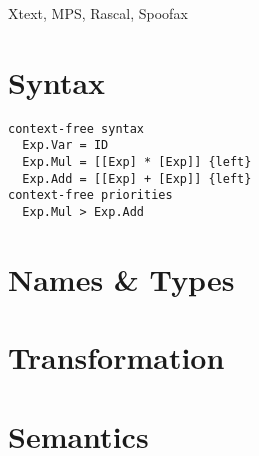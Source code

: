 Xtext, MPS, Rascal, Spoofax

\newpage



\newpage
\chapter{Syntax}

\begin{verbatim}
context-free syntax
  Exp.Var = ID
  Exp.Mul = [[Exp] * [Exp]] {left}
  Exp.Add = [[Exp] + [Exp]] {left}
context-free priorities
  Exp.Mul > Exp.Add
\end{verbatim}


\newpage
\chapter{Names \& Types}

\newpage
\chapter{Transformation}

\newpage
\newpage
\chapter{Semantics}

